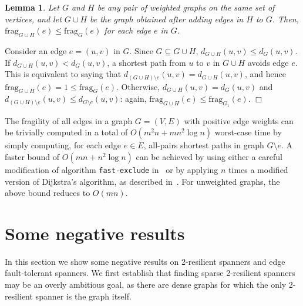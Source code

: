 \documentclass{article}
\newcommand{\dist}          {d}
\newcommand{\frag}          {\mathrm{frag}}
\newtheorem{lemma}[theorem]{Lemma}
\newcommand{\qed}{\hfill \ensuremath{\Box}}
\newenvironment{proof}{\vspace{1ex}\noindent{\bf Proof.}\hspace{0.5em}}
	{\hfill\qed\vspace{2ex}}
\begin{document}
\begin{lemma}\label{le:monotone}
Let $G$ and $H$ be any pair of weighted graphs on the same set of vertices, and let  $G\cup H$ be the graph obtained after adding edges in $H$ to $G$. 
Then, $\frag_{G\cup H}(e) \leq \frag_{G}(e)$ for each edge $e$ in $G$.
\end{lemma}
\begin{proof}
Consider an edge $e=(u,v)$ in $G$. Since $G \subseteq G\cup H$,  $\dist_{G\cup H}(u,v) \leq \dist_{G}(u,v)$.
If $\dist_{G\cup H}(u,v) < \dist_{G}(u,v)$, a shortest path from $u$ to $v$ in $G\cup H$ avoids edge $e$. This is equivalent to saying that $\dist_{(G\cup H) \setminus e}(u,v) = \dist_{G\cup H}(u,v)$, and hence $\frag_{G\cup H}(e) = 1 \leq \frag_{G}(e)$.
Otherwise, $\dist_{G\cup H}(u,v) = \dist_{G}(u,v)$ and $\dist_{(G\cup H) \setminus e}(u,v) \leq \dist_{G\setminus e}(u,v)$: again, $\frag_{G\cup H}(e) \leq \frag_{G_1}(e)$. 
\end{proof}




The fragility of all edges in a graph $G=(V,E)$ with positive edge weights can be trivially computed in a total of $O(m^2 n + mn^2 \log n)$ worst-case time by simply computing, for each edge $e\in E$, all-pairs shortest paths in graph $G\setminus e$. A faster bound of $O(m n +n^2\log n)$ can be achieved by using either a careful modification of algorithm \texttt{fast-exclude} in~\cite{CamilThorup} or by applying $n$ times a modified version of Dijkstra's algorithm, as described in~\cite{Dagstuhl4}. For unweighted graphs, the above bound reduces to $O(m n)$.


\section{Some negative results}\label{se:negative}
In this section we show some negative results on 2-resilient spanners and edge fault-tolerant spanners.
We first establish that finding sparse 2-resilient spanners may be an overly ambitious goal, as there are dense graphs for which the only 2-resilient spanner is the graph itself.
\end{document}
